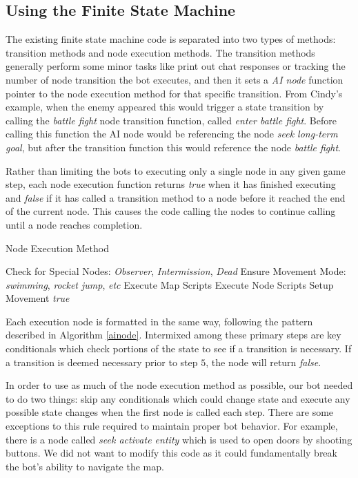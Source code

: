 \subsection{Using the Finite State Machine}

The existing finite state machine code is separated into two types of methods: transition methods and node execution methods. The transition methods generally perform some minor tasks like print out chat responses or tracking the number of node transition the bot executes, and then it sets a \emph{AI node} function pointer to the node execution method for that specific transition. From Cindy's example, when the enemy appeared this would trigger a state transition by calling the \emph{battle fight} node transition function, called \emph{enter battle fight}. Before calling this function the AI node would be referencing the node \emph{seek long-term goal}, but after the transition function this would reference the node \emph{battle fight}.

Rather than limiting the bots to executing only a single node in any given game step, each node execution function returns \emph{true} when it has finished executing and \emph{false} if it has called a transition method to a node before it reached the end of the current node. This causes the code calling the nodes to continue calling until a node reaches completion.

\begin{algorithm}
\caption{Node Execution Method}
\label{ainode}
    {\fontsize{12}{10}\selectfont
    \begin{algorithmic}[1]
        \STATE Check for Special Nodes: \emph{Observer}, \emph{Intermission}, \emph{Dead}
        \STATE Ensure Movement Mode: \emph{swimming}, \emph{rocket jump}, \emph{etc}
        \STATE Execute Map Scripts
        \STATE Execute Node Scripts
        \STATE Setup Movement
        \RETURN \emph{true}
    \end{algorithmic}
    }
\end{algorithm}

Each execution node is formatted in the same way, following the pattern described in Algorithm \ref{ainode}. Intermixed among these primary steps are key conditionals which check portions of the state to see if a transition is necessary. If a transition is deemed necessary prior to step $5$, the node will return \emph{false}.

In order to use as much of the node execution method as possible, our bot needed to do two things: skip any conditionals which could change state and execute any possible state changes when the first node is called each step. There are some exceptions to this rule required to maintain proper bot behavior. For example, there is a node called \emph{seek activate entity} which is used to open doors by shooting buttons. We did not want to modify this code as it could fundamentally break the bot's ability to navigate the map.


